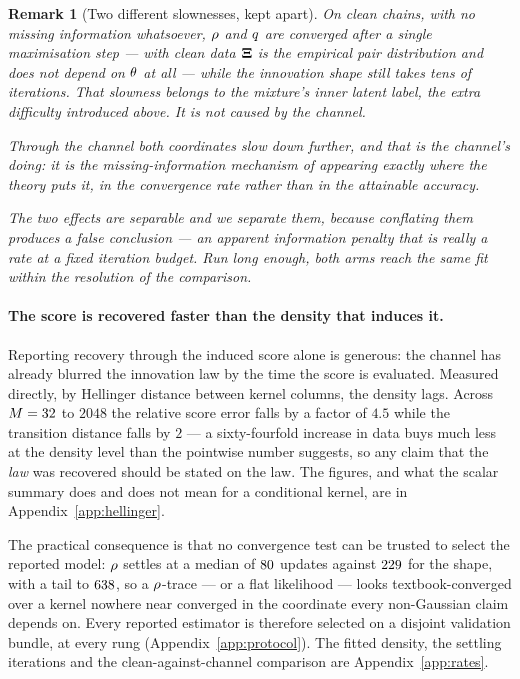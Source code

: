 \documentclass{article}
\newtheorem{remark}{Remark}
\theoremstyle{definition}
\theoremstyle{plain}
\begin{document}
\begin{remark}[Two different slownesses, kept apart]
\label{rem:rates}
On \emph{clean} chains, with no missing information whatsoever, $\rho$ and $q$ are converged
after a single maximisation step --- with clean data $\mathbf{\Xi}$ is the empirical pair distribution and
does not depend on $\theta$ at all --- while the innovation shape still takes tens of iterations.
That slowness belongs to the mixture's inner latent label, the extra difficulty introduced above. It is not caused by the channel.

Through the channel both coordinates slow down further, and \emph{that} is the channel's doing:
it is the missing-information mechanism of \citet{dempster1977maximum} appearing exactly where the theory
puts it, in the convergence rate rather than in the attainable accuracy.

The two effects are separable and we separate them, because conflating them produces a false
conclusion --- an apparent \emph{information} penalty that is really a rate at a fixed iteration
budget. Run long enough, both arms reach the same fit within the resolution of the comparison.
\end{remark}

\paragraph{The score is recovered faster than the density that induces it.} Reporting recovery
through the induced score alone is generous: the channel has already blurred the innovation law by
the time the score is evaluated. Measured directly, by Hellinger distance between kernel columns,
the density lags. Across $M=32$ to $2048$ the relative score error falls by a factor of $4.5$
while the transition distance falls by $2$ --- a sixty-fourfold increase in data buys much less at
the density level than the pointwise number suggests, so any claim that the \emph{law} was
recovered should be stated on the law. The figures, and what the scalar summary does and does not
mean for a conditional kernel, are in Appendix~\ref{app:hellinger}.

\noindent
The practical consequence is that no convergence test can be trusted to select the reported model:
$\rho$ settles at a median of $80$ updates against $229$ for the shape, with a
tail to $638$, so a $\rho$-trace --- or a flat likelihood --- looks textbook-converged
over a kernel nowhere near converged in the coordinate every non-Gaussian claim depends on. Every reported estimator is therefore selected on
a disjoint validation bundle, at every rung (Appendix~\ref{app:protocol}). The fitted density,
the settling iterations and the clean-against-channel comparison are Appendix~\ref{app:rates}.
\end{document}
